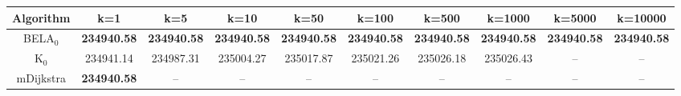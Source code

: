 \begin{tabular}{c|ccccccccc}\toprule
Algorithm & k=1 & k=5 & k=10 & k=50 & k=100 & k=500 & k=1000 & k=5000 & k=10000 \\ \midrule
BELA$_0$ & \textbf{234940.58} & \textbf{234940.58} & \textbf{234940.58} & \textbf{234940.58} & \textbf{234940.58} & \textbf{234940.58} & \textbf{234940.58} & \textbf{234940.58} & \textbf{234940.58} \\
K$_0$ & 234941.14 & 234987.31 & 235004.27 & 235017.87 & 235021.26 & 235026.18 & 235026.43 & -- & -- \\
mDijkstra & \textbf{234940.58} & -- & -- & -- & -- & -- & -- & -- & -- \\ \bottomrule 
\end{tabular}

